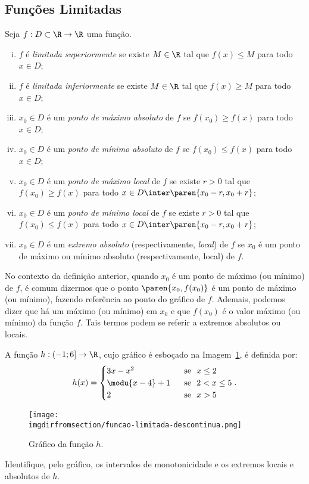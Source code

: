 \subsection{Funções Limitadas}

\begin{definition}
	Seja $f: D \subset \R \to \R$ uma função.
\begin{enumerate}[(i)]
  \item $f$ é \emph{limitada superiormente} se existe $M \in \R$ tal
  que $f(x) \leq M$ para todo $x \in D$;
  \item $f$ é \emph{limitada inferiormente} se existe $M \in \R$ tal
  que $f(x) \geq M$ para todo $x \in D$;
  \item $x_0 \in D$ é um \emph{ponto de máximo absoluto} de $f$ se
  $f(x_0) \geq f(x)$ para todo $x \in D$;
  \item $x_0 \in D$ é um \emph{ponto de mínimo absoluto} de $f$ se
  $f(x_0) \leq f(x)$ para todo $x \in D$;
  \item $x_0 \in D$ é um \emph{ponto de máximo local} de $f$ se
  existe $r>0$ tal que $f(x_0) \geq f(x)$ para todo $x \in D \inter \paren{x_0 - r , x_0+r}$;
  \item $x_0 \in D$ é um \emph{ponto de mínimo local} de $f$ se
  existe $r>0$ tal que $f(x_0) \leq f(x)$ para todo $x \in D \inter \paren{x_0 - r ,
  x_0+r}$;
  \item $x_0 \in D$ é um \emph{extremo absoluto} (respectivamente, \emph{local}) de $f$ se $x_0$ é um ponto de máximo ou mínimo absoluto (respectivamente, local) de $f$.
\end{enumerate}
\end{definition}

\begin{remark}
	No contexto da definição anterior, quando $x_0$ é um ponto de máximo (ou mínimo) de $f$, é comum dizermos que o ponto $\paren {x_0 , f(x_0)}$ é um ponto de máximo (ou mínimo), fazendo referência ao ponto do gráfico de $f$. Ademais, podemos dizer que há um máximo (ou mínimo) em $x_0$ e que $f(x_0)$ é o valor máximo (ou mínimo) da função $f$. Tais termos podem se referir a extremos absolutos ou locais.
\end{remark}

\begin{example}
	A função $h : \left( -1 ; 6 \right] \to \R$, cujo gráfico é esboçado
na Imagem~\ref{img:funcao-limitada-descontinua}, é definida por:
%
$$h(x) = \begin{cases}
								3x-x^2 & \ \text{ se } \ x\leq 2 \\
								\modu{x-4} +1 & \ \text{ se } \ 2 < x \leq 5 \\
								2 & \ \text{ se } \ x > 5 \\
								\end{cases}.$$
%
\begin{figure}[H]
	\centering
	\texttt{[image: \\imgdirfromsection/funcao-limitada-descontinua.png]}
	\caption{Gráfico da função $h$.}
	\label{img:funcao-limitada-descontinua}
\end{figure}
%
Identifique, pelo gráfico, os intervalos de monotonicidade e os extremos locais e absolutos de $h$.
\end{example}

